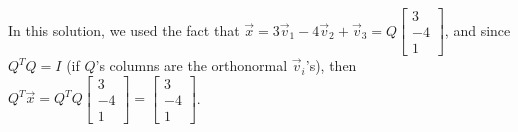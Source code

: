 \documentclass[11pt]{article}
\begin{document}
\begin{prob}[(10 pts)]
\begin{subprob}
\begin{solution}
In this solution, we used the fact that $\vec x = 3 \vec v_1 - 4 \vec v_2 + \vec v_3 = Q \begin{bmatrix} 3 \\ -4 \\ 1 \end{bmatrix}$, and since $Q^T Q = I$ (if $Q$'s columns are the orthonormal $\vec v_i$'s), then $Q^T \vec x = Q^TQ \begin{bmatrix} 3 \\ -4 \\ 1 \end{bmatrix} = \begin{bmatrix} 3 \\ -4 \\ 1 \end{bmatrix}$.

\end{solution}

\end{subprob}

\end{prob}

\newpage
\end{document}

